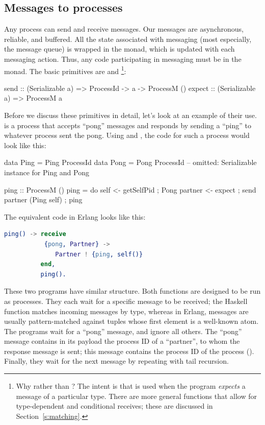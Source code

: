 \documentclass[preprint]{sigplanconf}
\begin{document}
\subsection{Messages to processes}
\label{s:sendAndExpect}

Any process can send and receive messages. Our messages are asynchronous, reliable, and buffered.  All the state associated with messaging (most especially, the message queue) is wrapped in the  monad, which is updated with each messaging action. Thus, any code participating in messaging must be in the  monad.  The basic primitives are  and \footnote{Why  rather than ?  The intent is that  is used when the program \emph{expects} a message of a particular type.  
There are more general  functions that allow for type-dependent and conditional receives;  these are discussed in Section~\ref{s:matching}.}:

\par{\small
\begin{code}
send :: (Serializable a) => ProcessId -> a 
						-> ProcessM ()
expect :: (Serializable a) => ProcessM a
\end{code}}
\noindent

Before we discuss these primitives in detail, let's look at an example of their use.
 is a process that accepts ``pong'' messages and responds by sending a ``ping'' to whatever process sent the pong. Using  and , the code for such a process would look like this:

\begin{code}
data Ping = Ping ProcessId
data Pong = Pong ProcessId
-- omitted: Serializable instance for Ping and Pong

ping :: ProcessM ()
ping = do { self <- getSelfPid
          ; Pong partner <- expect
          ; send partner (Ping self)
          ; ping }
\end{code}

\noindent The equivalent code in Erlang looks like this:

\begin{lstlisting}[language=Erlang]
ping() -> receive
           {pong, Partner} -> 
              Partner ! {ping, self()}
          end,
          ping().               
\end{lstlisting}

These two programs have similar structure. Both  functions are designed to be run as processes. They each wait for a specific message to be received; the Haskell  function matches incoming messages by type, whereas in Erlang, messages are usually pattern-matched against tuples whose first element is a well-known atom. The programs wait for a ``pong'' message, and ignore all others. The ``pong'' message contains in its payload the process ID of a ``partner'', to whom the response message is sent; this message contains the process ID of the  process (). Finally, they wait for the next message by repeating with tail recursion.
\end{document}
